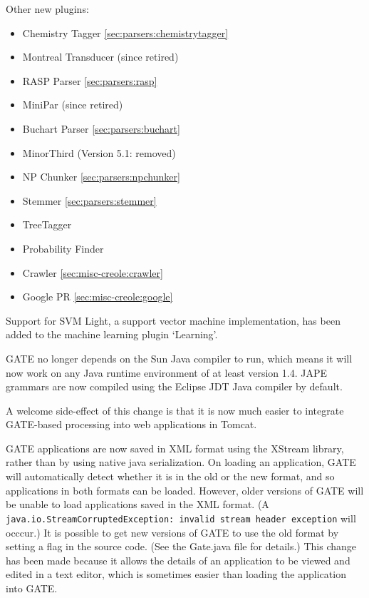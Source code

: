 Other new plugins:
\begin{itemize}
\item Chemistry Tagger \ref{sec:parsers:chemistrytagger}
\item Montreal Transducer (since retired)
\item RASP Parser \ref{sec:parsers:rasp}
\item MiniPar (since retired)
\item Buchart Parser \ref{sec:parsers:buchart}
\item MinorThird (Version 5.1: removed)
\item NP Chunker \ref{sec:parsers:npchunker}
\item Stemmer \ref{sec:parsers:stemmer}
\item TreeTagger %
\item Probability Finder %
\item Crawler \ref{sec:misc-creole:crawler}
\item Google PR \ref{sec:misc-creole:google}
\end{itemize}

Support for SVM Light, a support vector machine implementation, has been added
to the machine learning plugin `Learning'.



GATE no longer depends on the Sun Java compiler to run, which means it will now
work on any Java runtime environment of at least version 1.4.  JAPE grammars
are now compiled using the Eclipse JDT Java compiler by default.

A welcome side-effect of this change is that it is now much easier to integrate
GATE-based processing into web applications in Tomcat.


GATE applications are now saved in XML format using the XStream library,
rather than by using native java
serialization. On loading an application, GATE
will automatically detect whether it is in the old or the new format, and so
applications in both formats can be loaded. However, older
versions of GATE will be unable to load applications saved in the XML format. (A
{\tt java.io.StreamCorruptedException: invalid stream header exception} will
occcur.) It is possible to get new versions of GATE to use the old format by
setting a flag in the source code. (See the Gate.java file for details.) This
change has been made because it allows the details of an application to be
viewed and edited in a text editor, which is sometimes easier than loading the
application into GATE.

